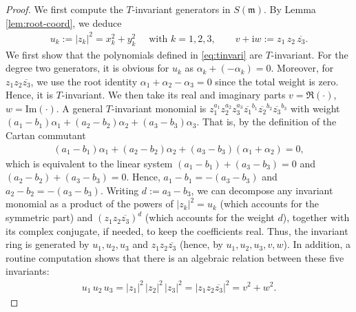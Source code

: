\documentclass[10pt,a4paper]{amsart}
\begin{document}
\begin{proof}
We first compute the $T$-invariant generators in $S(\mathfrak{m})$. By Lemma \ref{lem:root-coord}, we deduce  \begin{align}
    u_k:= |z_k|^2=x_k^2+y_k^2\quad \text{ with } k=1,2,3,\qquad v+\mathrm{i}w:=z_1\,z_2\,\overline{z_3} . \label{eq:tinvari}
\end{align} We first show that the polynomials defined in \eqref{eq:tinvari} are $T$-invariant. For the degree two generators, it is obvious for $u_k$ as $\alpha_k +  (-\alpha_k) = 0$. Moreover, for $z_1 z_2 \overline{z_3}$, we use the root identity $\alpha_1+\alpha_2-\alpha_3=0$ since the total weight is zero. Hence, it is $T$-invariant. We then take its real and imaginary parts $v=\Re(\cdot)$, $w=\mathrm{Im}(\cdot)$. A general $T$-invariant monomial is $z_1^{a_1}z_2^{a_2}z_3^{a_3}
\overline{z_1}^{b_1}\overline{z_2}^{b_2}\overline{z_3}^{b_3}$ with weight $(a_1-b_1)\alpha_1+(a_2-b_2)\alpha_2+(a_3-b_3)\alpha_3$. That is, by the definition of the Cartan commutant \begin{align*}
  (a_1-b_1)\alpha_1+(a_2-b_2)\alpha_2+(a_3-b_3)(\alpha_1+\alpha_2)=0,  
\end{align*} which is equivalent to the linear system $ (a_1-b_1)+(a_3-b_3)=0$ and  $ (a_2-b_2)+(a_3-b_3)=0$. Hence, $a_1-b_1=-(a_3-b_3)$ and $a_2-b_2=-(a_3-b_3)$. Writing $d:=a_3-b_3$, we can decompose any invariant monomial as a product of the powers of $|z_k|^2=u_k$ (which accounts for the symmetric part) and $(z_1z_2\overline{z_3})^d$ (which accounts for the weight $d$), together with its complex conjugate, if needed, to keep the coefficients real. Thus, the invariant ring is generated by $u_1,u_2,u_3$ and $z_1z_2\overline{z_3}$ (hence, by $u_1,u_2,u_3,v,w$).  In addition, a routine computation shows that there is an algebraic relation between these five invariants: \begin{align}
 u_1\,u_2\,u_3=|z_1|^2\,|z_2|^2\,|z_3|^2 =|z_1 z_2 \overline{z_3}|^2=v^2+w^2 . \label{eq:plrelation}
\end{align}   %


\end{proof}
\end{document}
